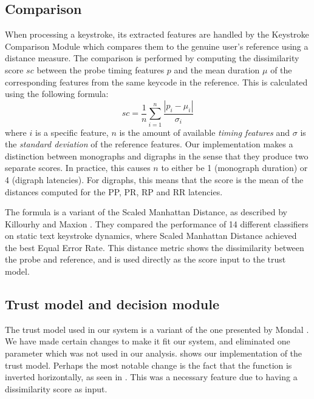 \subsection{Comparison}
\label{sec:system-design-CA-matching}
When processing a keystroke, its extracted features are handled by the Keystroke Comparison Module which compares them to the genuine user's reference using a distance measure.
The comparison is performed by computing the dissimilarity score $sc$ between the probe timing features $p$ and the mean duration $\mu$ of the corresponding features from the same keycode in the reference.
This is calculated using the following formula:
$$ sc=\frac{1}{n}\sum_{i=1}^{n}\frac{|p_i-\mu_i|}{\sigma_i} $$
where $i$ is a specific feature, $n$ is the amount of available \textit{timing features} and $\sigma$ is the \textit{standard deviation} of the reference features.
Our implementation makes a distinction between monographs and digraphs in the sense that they produce two separate scores.
In practice, this causes $n$ to either be 1 (monograph duration) or 4 (digraph latencies).
For digraphs, this means that the score is the mean of the distances computed for the PP, PR, RP and RR latencies.

The formula is a variant of the Scaled Manhattan Distance, as described by Killourhy and Maxion \cite{Killourhy}.
They compared the performance of 14 different classifiers on static text keystroke dynamics, where Scaled Manhattan Distance achieved the best Equal Error Rate.
This distance metric shows the dissimilarity between the probe and reference, and is used directly as the score input to the trust model.


\subsection{Trust model and decision module}
The trust model used in our system is a variant of the one presented by Mondal \cite{mondal}.
We have made certain changes to make it fit our system, and eliminated one parameter which was not used in our analysis.
 shows our implementation of the trust model.
Perhaps the most notable change is the fact that the function is inverted horizontally, as seen in .
This was a necessary feature due to having a dissimilarity score as input.

